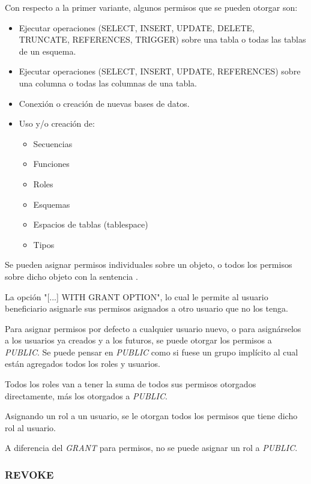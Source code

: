 Con respecto a la primer variante, algunos permisos que se pueden otorgar son:
\begin{itemize}
    \item Ejecutar operaciones (SELECT, INSERT, UPDATE, DELETE, TRUNCATE, REFERENCES, TRIGGER) sobre una tabla o todas las tablas de un esquema.
    \item Ejecutar operaciones (SELECT, INSERT, UPDATE, REFERENCES) sobre una columna o todas las columnas de una tabla.
    \item Conexión o creación de nuevas bases de datos.
    \item Uso y/o creación de:
        \begin{itemize}
        \item Secuencias
        \item Funciones
        \item Roles
        \item Esquemas
        \item Espacios de tablas (tablespace)
        \item Tipos
        \end{itemize}
\end{itemize}

Se pueden asignar permisos individuales sobre un objeto, o todos los permisos sobre dicho objeto con la sentencia .

La opción "[...] WITH GRANT OPTION", lo cual le permite al usuario beneficiario asignarle sus permisos asignados a otro usuario que no los tenga.

Para asignar permisos por defecto a cualquier usuario nuevo, o para asignárselos a los usuarios ya creados y a los futuros, se puede otorgar los permisos a \emph{PUBLIC}. Se puede pensar en \emph{PUBLIC} como si fuese un grupo implícito al cual están agregados todos los roles y usuarios.

Todos los roles van a tener la suma de todos sus permisos otorgados directamente, más los otorgados a \emph{PUBLIC}.

Asignando un rol a un usuario, se le otorgan todos los permisos que tiene dicho rol al usuario.

A diferencia del \emph{GRANT} para permisos, no se puede asignar un rol a \emph{PUBLIC}. 

\subsubsection{REVOKE}

